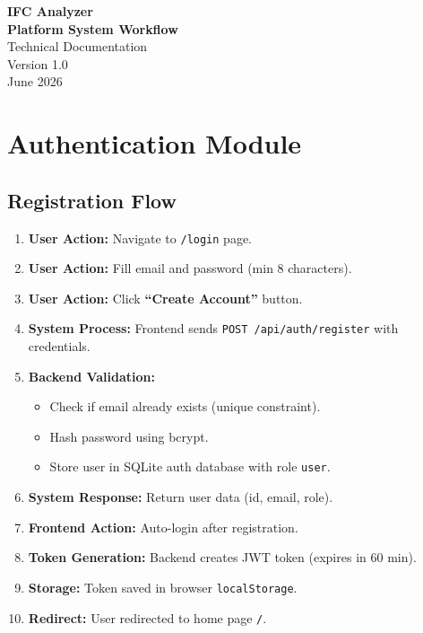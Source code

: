 \documentclass[11pt,a4paper]{article}
\begin{document}
\begin{titlepage}
\centering
\vspace*{3cm}
{\Huge\bfseries IFC Analyzer\\[0.5cm]
\Large Platform System Workflow\\[2cm]}
{\large Technical Documentation\\[0.3cm]
Version 1.0\\[3cm]}
{\large June 2026}
\vfill
\end{titlepage}

\tableofcontents
\newpage

\section{Authentication Module}

\subsection{Registration Flow}

\begin{enumerate}[leftmargin=*]
    \item \textbf{User Action:} Navigate to \texttt{/login} page.
    \item \textbf{User Action:} Fill email and password (min 8 characters).
    \item \textbf{User Action:} Click \textbf{``Create Account''} button.
    \item \textbf{System Process:} Frontend sends \texttt{POST /api/auth/register} with credentials.
    \item \textbf{Backend Validation:} 
        \begin{itemize}
            \item Check if email already exists (unique constraint).
            \item Hash password using bcrypt.
            \item Store user in SQLite auth database with role \texttt{user}.
        \end{itemize}
    \item \textbf{System Response:} Return user data (id, email, role).
    \item \textbf{Frontend Action:} Auto-login after registration.
    \item \textbf{Token Generation:} Backend creates JWT token (expires in 60 min).
    \item \textbf{Storage:} Token saved in browser \texttt{localStorage}.
    \item \textbf{Redirect:} User redirected to home page \texttt{/}.
\end{enumerate}
\end{document}
